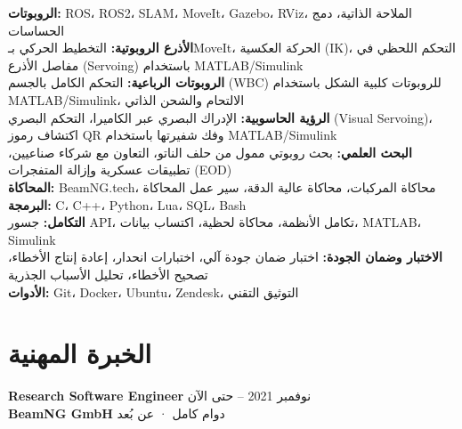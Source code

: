 \documentclass[11pt,a4paper]{article}
\newcommand{\en}[1]{\textenglish{#1}}
\begin{document}
{\small
\textbf{الروبوتات:} \en{ROS}، \en{ROS2}، \en{SLAM}، \en{MoveIt}، \en{Gazebo}، \en{RViz}، الملاحة الذاتية، دمج الحساسات\\
\textbf{الأذرع الروبوتية:} التخطيط الحركي بـ\en{MoveIt}، الحركة العكسية (\en{IK})، التحكم اللحظي في مفاصل الأذرع (\en{Servoing}) باستخدام \en{MATLAB/Simulink}\\
\textbf{الروبوتات الرباعية:} التحكم الكامل بالجسم (\en{WBC}) للروبوتات كلبية الشكل باستخدام \en{MATLAB/Simulink}، الالتحام والشحن الذاتي\\
\textbf{الرؤية الحاسوبية:} الإدراك البصري عبر الكاميرا، التحكم البصري (\en{Visual Servoing})، اكتشاف رموز \en{QR} وفك شفيرتها باستخدام \en{MATLAB/Simulink}\\
\textbf{البحث العلمي:} بحث روبوتي ممول من حلف الناتو، التعاون مع شركاء صناعيين، تطبيقات عسكرية وإزالة المتفجرات (\en{EOD})\\
\textbf{المحاكاة:} \en{BeamNG.tech}، محاكاة المركبات، محاكاة عالية الدقة، سير عمل المحاكاة\\
\textbf{البرمجة:} \en{C}، \en{C++}، \en{Python}، \en{Lua}، \en{SQL}، \en{Bash}\\
\textbf{التكامل:} جسور \en{API}، تكامل الأنظمة، محاكاة لحظية، اكتساب بيانات، \en{MATLAB}، \en{Simulink}\\
\textbf{الاختبار وضمان الجودة:} اختبار ضمان جودة آلي، اختبارات انحدار، إعادة إنتاج الأخطاء، تصحيح الأخطاء، تحليل الأسباب الجذرية\\
\textbf{الأدوات:} \en{Git}، \en{Docker}، \en{Ubuntu}، \en{Zendesk}، التوثيق التقني
}

\section*{الخبرة المهنية}

\textbf{\en{Research Software Engineer}} \hfill نوفمبر 2021 -- حتى الآن\\
\textbf{\en{BeamNG GmbH}} \hfill دوام كامل · عن بُعد
\end{document}
